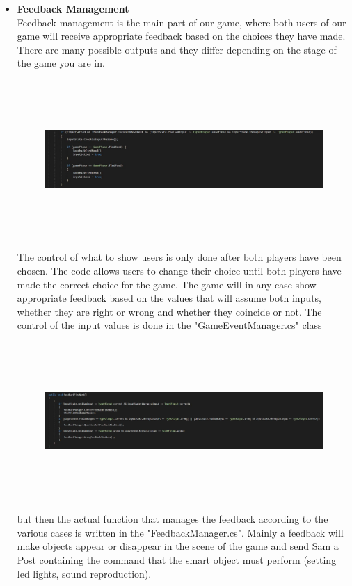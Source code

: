 \documentclass [12pt]{article}
\begin{document}
\begin{itemize}[•]
\item \textbf{Feedback Management}\\
Feedback management is the main part of our game, where both users of our game will receive appropriate feedback based on the choices they have made.
There are many possible outputs and they differ depending on the stage of the game you are in.

\begin{figure}[ht!]
\centering
\includegraphics[height=6cm,width=17cm]{ControlloInput.jpg}
\end{figure}

The control of what to show users is only done after both players have been chosen. The code allows users to change their choice until both players have made the correct choice for the game.
The game will in any case show appropriate feedback based on the values that will assume both inputs, whether they are right or wrong and whether they coincide or not.
The control of the input values is done in the "GameEventManager.cs" class

\begin{figure}[ht!]
\centering
\includegraphics[height=6cm,width=17cm]{PossibiliFeedback.jpg}
\end{figure}


but then the actual function that manages the feedback according to the various cases is written in the "FeedbackManager.cs". Mainly a feedback will make objects appear or disappear in the scene of the game and send Sam a Post containing the command that the smart object must perform (setting led lights, sound reproduction). \\


\end{itemize}
\end{document}
